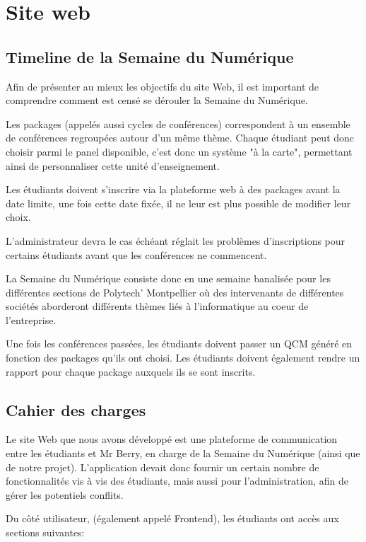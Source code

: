\chapter{Site web}
    \section{Timeline de la Semaine du Numérique}

    Afin de présenter au mieux les objectifs du site Web, il est important de comprendre comment
    est censé se dérouler la Semaine du Numérique.

    Les packages (appelés aussi cycles de conférences) correspondent à un ensemble de conférences regroupées autour d'un même thème.
    Chaque étudiant peut donc choisir parmi le panel disponible, c'est donc un système "à la carte", permettant
    ainsi de personnaliser cette unité d'enseignement.

    Les étudiants doivent s'inscrire via la plateforme web à des packages avant la date limite, une fois cette date fixée,
    il ne leur est plus possible de modifier leur choix.

    L'administrateur devra le cas échéant réglait les problèmes d'inscriptions pour certains étudiants avant que les conférences ne commencent.

    La Semaine du Numérique consiste donc en une semaine banalisée pour les différentes sections de Polytech' Montpellier
    où des intervenants de différentes sociétés aborderont différents thèmes liés à l'informatique au coeur de l'entreprise.

    Une fois les conférences passées, les étudiants doivent passer un QCM généré en fonction des packages qu'ils ont choisi.
    Les étudiants doivent également rendre un rapport pour chaque package auxquels ils se sont inscrits.

    \section{Cahier des charges}
    Le site Web que nous avons développé est une plateforme de communication entre les étudiants
    et Mr Berry, en charge de la Semaine du Numérique (ainsi que de notre projet).
    L'application devait donc fournir un certain nombre de fonctionnalités vis à vis des étudiants,
    mais aussi pour l'administration, afin de gérer les potentiels conflits.

    Du côté utilisateur, (également appelé Frontend), les étudiants ont accès aux sections suivantes:


